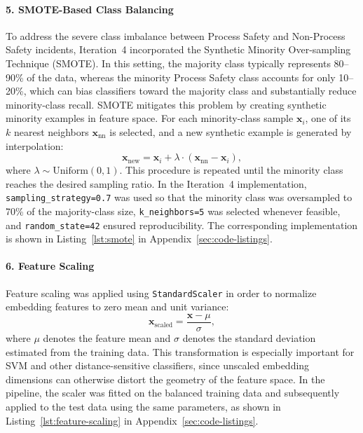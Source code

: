 \documentclass[11pt, titlepage, bibliography=totoc]{scrreprt}
\begin{document}
\paragraph{5. SMOTE-Based Class Balancing}
To address the severe class imbalance between Process Safety and Non-Process Safety incidents, Iteration~4 incorporated the Synthetic Minority Over-sampling Technique (SMOTE). In this setting, the majority class typically represents 80--90\% of the data, whereas the minority Process Safety class accounts for only 10--20\%, which can bias classifiers toward the majority class and substantially reduce minority-class recall. SMOTE mitigates this problem by creating synthetic minority examples in feature space. For each minority-class sample $\mathbf{x}_i$, one of its $k$ nearest neighbors $\mathbf{x}_{\text{nn}}$ is selected, and a new synthetic example is generated by interpolation:
\begin{equation}
\mathbf{x}_{\text{new}} = \mathbf{x}_i + \lambda \cdot (\mathbf{x}_{\text{nn}} - \mathbf{x}_i),
\end{equation}
where $\lambda \sim \text{Uniform}(0, 1)$. This procedure is repeated until the minority class reaches the desired sampling ratio. In the Iteration~4 implementation, \texttt{sampling\_strategy=0.7} was used so that the minority class was oversampled to 70\% of the majority-class size, \texttt{k\_neighbors=5} was selected whenever feasible, and \texttt{random\_state=42} ensured reproducibility. The corresponding implementation is shown in Listing~\ref{lst:smote} in Appendix~\ref{sec:code-listings}.

\paragraph{6. Feature Scaling}
Feature scaling was applied using \texttt{StandardScaler} in order to normalize embedding features to zero mean and unit variance:
\begin{equation}
\mathbf{x}_{\text{scaled}} = \frac{\mathbf{x} - \mu}{\sigma},
\end{equation}
where $\mu$ denotes the feature mean and $\sigma$ denotes the standard deviation estimated from the training data. This transformation is especially important for SVM and other distance-sensitive classifiers, since unscaled embedding dimensions can otherwise distort the geometry of the feature space. In the pipeline, the scaler was fitted on the balanced training data and subsequently applied to the test data using the same parameters, as shown in Listing~\ref{lst:feature-scaling} in Appendix~\ref{sec:code-listings}.
\end{document}
